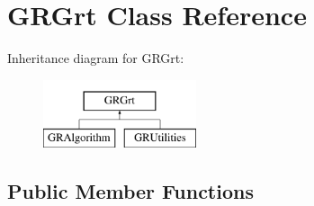 \hypertarget{classGRGrt}{}\section{G\+R\+Grt Class Reference}
\label{classGRGrt}
Inheritance diagram for G\+R\+Grt\+:\begin{figure}[H]
\begin{center}
\leavevmode
\includegraphics[height=2.000000cm]{classGRGrt}
\end{center}
\end{figure}
\subsection*{Public Member Functions}
